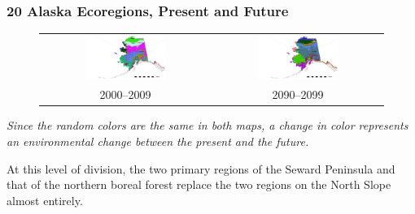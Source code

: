 \begin{frame}
 \frametitle{20 Alaska Ecoregions, Present and Future}
 \vskip-0.15in
 \setlength{\tabcolsep}{0pt}
 \begin{figure}
   \begin{tabular}{cc}
   \includegraphics[width=0.50\textwidth]{ngee_figures/alaska_dem_Feb2012_20_2000-2009_barscale} &
   \includegraphics[width=0.50\textwidth]{ngee_figures/alaska_dem_Feb2012_20_2090-2099_barscale} \\
   2000--2009 & 2090--2099 \\
   \end{tabular}
  \vbox{\scriptsize\hfill\citep{Hoffman_LandscapeEcol_20131001}}
  \label{fig:alaska_both_20}
 \end{figure}
 \vskip-0.15in
\emph{Since the random colors are the same in both maps, a change in color
represents an environmental change between the present and the future.}

At this level of division, the two primary regions of the Seward
Peninsula and that of the northern boreal forest replace the two
regions on the North Slope almost entirely.

\end{frame}

